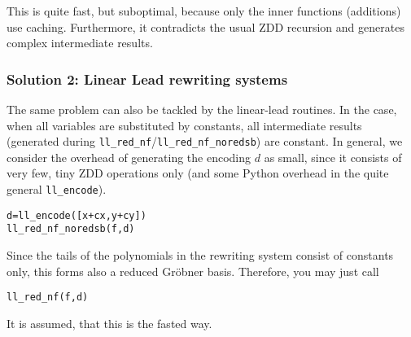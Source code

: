 \documentclass[]{article}
\begin{document}
This is quite fast, but suboptimal, because only the inner functions (additions) use caching.
%
Furthermore, it contradicts the usual ZDD recursion and generates complex intermediate results.

\subsubsection{Solution 2: Linear Lead rewriting systems}
The same problem can also be tackled by the linear-lead routines. In the case, when
all variables are substituted by  constants, all intermediate results
(generated during \verb|ll_red_nf|/\verb|ll_red_nf_noredsb|) are constant.
In general, we consider the overhead of generating the encoding $d$ as small, 
since it consists of very few, tiny ZDD operations only (and some Python overhead in the quite general \verb|ll_encode|).
\begin{verbatim}
d=ll_encode([x+cx,y+cy])
ll_red_nf_noredsb(f,d)
\end{verbatim}
%
%
Since the tails of the polynomials in the rewriting system   consist of
constants only, this forms also a
reduced Gröbner basis. Therefore, you may just call
\begin{verbatim}
ll_red_nf(f,d)   
\end{verbatim}
%
%
It is assumed, that this is the fasted way.


%
\end{document}
